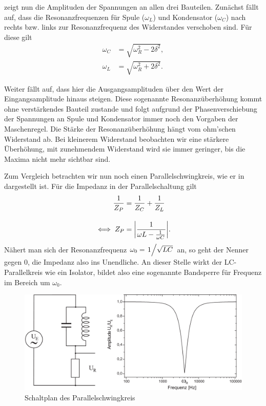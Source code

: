  zeigt nun die Amplituden der Spannungen an allen drei Bauteilen. Zunächst fällt auf, dass die Resonanzfrequenzen für Spule ($\omega_L$) und Kondensator ($\omega_C$) nach rechts bzw. links zur Resonanzfrequenz des Widerstandes verschoben sind. Für diese gilt
\begin{align}
  \omega_C &= \sqrt{\omega_R^2 - 2\delta^2},\label{eq:rlc_omega_c}\\
  \omega_L &= \sqrt{\omega_R^2 + 2\delta^2}.\label{eq:rlc_omega_l}
\end{align}

Weiter fällt auf, dass hier die Ausgangsamplituden über den Wert der Eingangsamplitude hinaus steigen. Diese sogenannte Resonanzüberhöhung kommt ohne verstärkendes Bauteil zustande und folgt aufgrund der Phasenverschiebung der Spannungen an Spule und Kondensator immer noch den Vorgaben der Maschenregel. Die Stärke der Resonanzüberhöhung hängt vom ohm'schen Widerstand ab. Bei kleinerem Widerstand beobachten wir eine stärkere Überhöhung, mit zunehmendem Widerstand wird sie immer geringer, bis die Maxima nicht mehr sichtbar sind.

Zum Vergleich betrachten wir nun noch einen Parallelschwingkreis, wie er in  dargestellt ist. Für die Impedanz in der Parallelschaltung gilt
\begin{align}
  \frac{1}{Z_P} &= \frac{1}{Z_C} + \frac{1}{Z_L}\\[1em]
  \iff Z_P &= \qty|\frac{1}{\omega L - \frac{1}{\omega C}}|.
\end{align}
Nähert man sich der Resonanzfrequenz $\omega_0 = \ffrac{1}{\sqrt{LC}}$ an, so geht der Nenner gegen 0, die Impedanz also ins Unendliche. An dieser Stelle wirkt der LC-Parallelkreis wie ein Isolator, bildet also eine sogenannte Bandsperre für Frequenz im Bereich um $\omega_0$.

\begin{figure}[H]
  \centering
  \includegraphics[width=.70\textwidth]{files/script/parallelschwingkreis.png}
  \caption{Schaltplan des Parallelschwingkreis}
  \label{fig:parallelschwingkreis}
\end{figure}

